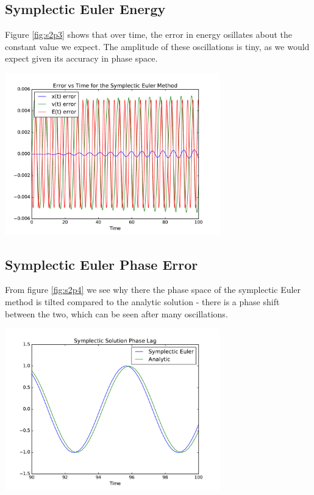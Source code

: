 \documentclass{article}
\newenvironment{Figure}
  {\par\medskip\noindent\minipage{\linewidth}}
  {\endminipage\par\medskip}
\begin{document}
\subsection{Symplectic Euler Energy}

Figure \ref{fig:s2p3} shows that over time, the error in energy osillates about the constant value we expect. The amplitude of these oscillations is tiny, as we would expect given its accuracy in phase space.

\begin{Figure}
\centering
\includegraphics[width=0.7\textwidth]{images/Sec2Plt3.pdf}
\label{fig:s2p3}
\end{Figure}

\subsection{Symplectic Euler Phase Error}

From figure \ref{fig:s2p4} we see why there the phase space of the symplectic Euler method is tilted compared to the analytic solution - there is a phase shift between the two, which can be seen after many oscillations.

\begin{Figure}
\centering
\includegraphics[width=0.7\textwidth]{images/Sec2Plt4.pdf}
\label{fig:s2p4}
\end{Figure}
\end{document}
